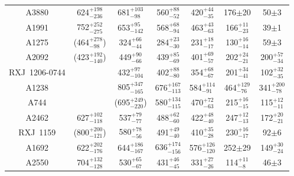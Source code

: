 \documentclass{aastex}
\begin{document}
\begin{table}
\begin{center}
{\begin{tabular}{ccccccc}
A3880 & 624$^{+198}_{-236}$ & 681$^{+103}_{-98}$ & 560$^{+88}_{-52}$ & 420$^{+44}_{-35}$ & 176$\pm$20 & 50$\pm$3 \\
A1991 & 752$^{+252}_{-275}$ & 653$^{+95}_{-142}$ & 568$^{+68}_{-94}$ & 463$^{+43}_{-63}$ & 166$^{+11}_{-23}$ & 39$\pm$1 \\
A1275 & (464$^{+278}_{-98}$) & 324$^{+66}_{-44}$ & 284$^{+23}_{-30}$ & 231$^{+18}_{-17}$ & 130$^{+16}_{-14}$ & 59$\pm$3 \\
A2092 & (423$^{+192}_{-140}$) & 449$^{+90}_{-66}$ & 439$^{+85}_{-69}$ & 401$^{+69}_{-57}$ & 202$^{+24}_{-21}$ & 200$^{+57}_{-34}$ \\
RXJ~1206-0744 & & 432$^{+97}_{-104}$ & 402$^{+88}_{-80}$ & 354$^{+68}_{-67}$ & 201$^{+34}_{-41}$ & 102$^{+32}_{-35}$ \\
A1238 &         & 805$^{+347}_{-165}$ & 676$^{+167}_{-113}$ & 584$^{+114}_{-91}$ & 464$^{+129}_{-76}$ & 341$^{+200}_{-78}$ \\
A744 &             & (695$^{+249}_{-220}$) & 580$^{+134}_{-115}$ & 470$^{+72}_{-63}$ & 215$^{+16}_{-15}$ & 115$^{+12}_{-11}$ \\
A2462 & 627$^{+102}_{-118}$ & 537$^{+79}_{-77}$ & 488$^{+62}_{-60}$ & 422$^{+48}_{-40}$ & 247$^{+12}_{-13}$ & 172$^{+20}_{-21}$ \\
RXJ~1159 & (800$^{+200}_{-121}$) & 580$^{+78}_{-56}$ & 491$^{+49}_{-40}$ & 410$^{+35}_{-28}$ & 230$^{+16}_{-17}$ & 92$\pm$6 \\
A1692 & 622$^{+202}_{-176}$ & 644$^{+186}_{-167}$ & 636$^{+174}_{-156}$ & 576$^{+126}_{-120}$ & 252$\pm$29 & 149$^{+30}_{-24}$ \\
A2550 & 704$^{+132}_{-128}$ & 530$^{+65}_{-67}$ & 431$^{+46}_{-45}$ & 331$^{+27}_{-26}$ & 114$^{+11}_{-8}$ & 46$\pm$3 \\

\hline \hline
\end{tabular}}
\vspace{-1.2cm}
\begin{flushleft}
\leftskip 35pt
\end{flushleft}
\end{center}
\end{table}
\end{document}
